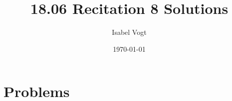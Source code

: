\documentclass[11pt]{article}
\title{18.06 Recitation 8 Solutions}
\author{Isabel Vogt}
\date{\today}                                           %
\newcommand{\rr}{\mathbb{R}}
\begin{document}
\maketitle
%
%
%
%

\section{Problems}
\end{document}

